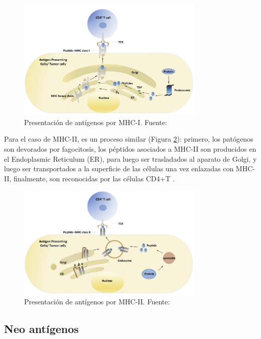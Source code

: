\begin{figure}[H]
	\centering
	\includegraphics[width=0.8\textwidth]{img/neoantigen/mhc1.jpg}
	\caption{Presentación de antígenos por MHC-I. Fuente: \cite{zhang2019application}}
	\label{fig:mhc1}
\end{figure}

Para el caso de MHC-II, es un proceso similar (Figura \ref{fig:mhc2}): primero, los patógenos son devorados por fagocitosis, los péptidos asociados a MHC-II son producidos en el Endoplasmic Reticulum (ER), para luego ser trasladados al aparato de Golgi, y luego ser transportados a la superficie de las células una vez enlazadas con MHC-II, finalmente, son reconocidas por las células CD4+T \citep{zhang2019application}.



\begin{figure}[H]
	\centering
	\includegraphics[width=0.8\textwidth]{img/neoantigen/mhc2.jpg}
	\caption{Presentación de antígenos por MHC-II. Fuente: \cite{zhang2019application}}
	\label{fig:mhc2}
\end{figure}

\subsection{Neo antígenos}

